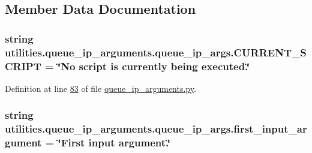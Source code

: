 \subsection{Member Data Documentation}
\hypertarget{classutilities_1_1queue__ip__arguments_1_1queue__ip__args_a453711109bd635e6263a99c8e85e3dff}{}
\subsubsection[{C\+U\+R\+R\+E\+N\+T\+\_\+\+S\+C\+R\+I\+P\+T}]{\setlength{\rightskip}{0pt plus 5cm}string utilities.\+queue\+\_\+ip\+\_\+arguments.\+queue\+\_\+ip\+\_\+args.\+C\+U\+R\+R\+E\+N\+T\+\_\+\+S\+C\+R\+I\+P\+T = \char`\"{}No script is currently being executed.\char`\"{}\hspace{0.3cm}{\ttfamily [static]}}\label{classutilities_1_1queue__ip__arguments_1_1queue__ip__args_a453711109bd635e6263a99c8e85e3dff}


Definition at line \hyperlink{queue__ip__arguments_8py_source_l00083}{83} of file \hyperlink{queue__ip__arguments_8py_source}{queue\+\_\+ip\+\_\+arguments.\+py}.

\hypertarget{classutilities_1_1queue__ip__arguments_1_1queue__ip__args_a14394c9820086e09d5b926d9910a180f}{}
\subsubsection[{first\+\_\+input\+\_\+argument}]{\setlength{\rightskip}{0pt plus 5cm}string utilities.\+queue\+\_\+ip\+\_\+arguments.\+queue\+\_\+ip\+\_\+args.\+first\+\_\+input\+\_\+argument = \char`\"{}First input argument.\char`\"{}\hspace{0.3cm}{\ttfamily [static]}}\label{classutilities_1_1queue__ip__arguments_1_1queue__ip__args_a14394c9820086e09d5b926d9910a180f}


